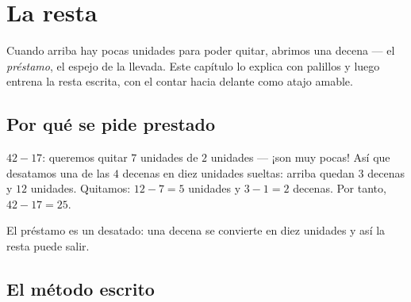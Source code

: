 \chapter{La resta}\label{ch:g2:subtraction}

Cuando arriba hay pocas unidades para poder quitar, abrimos una
decena --- el \emph{préstamo}, el espejo de la llevada. Este capítulo lo
explica con palillos y luego entrena la resta escrita, con
el contar hacia delante como atajo amable.

\section{Por qué se pide prestado}

\begin{example}\label{ex:g2:subtraction:unbundle}
$42 - 17$: queremos quitar $7$ unidades de $2$ unidades --- ¡son muy pocas!
Así que desatamos una de las $4$ decenas en diez unidades sueltas: arriba quedan
$3$ decenas y $12$ unidades. Quitamos: $12 - 7 = 5$ unidades y
$3 - 1 = 2$ decenas. Por tanto, $42 - 17 = 25$.
\end{example}

\begin{omfigure}

{\small El préstamo es un desatado: una decena se convierte en diez unidades y así
la resta puede salir.}
\end{omfigure}

\section{El método escrito}

